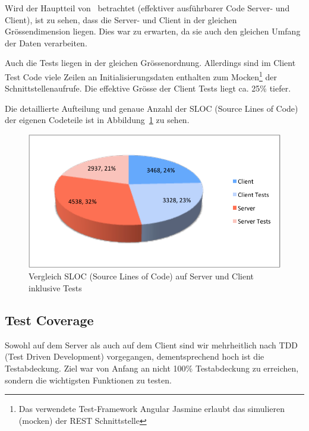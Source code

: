	Wird der Hauptteil von \eeppi\ betrachtet (effektiver ausführbarer Code Server- und Client),
	ist zu sehen, dass die Server- und Client in der gleichen Grössendimension liegen.
	Dies war zu erwarten, da sie auch den gleichen Umfang der Daten verarbeiten.
	
	Auch die Tests liegen in der gleichen Grössenordnung.
	Allerdings sind im Client Test Code viele Zeilen an Initialisierungsdaten enthalten zum Mocken\footnote{Das verwendete Test-Framework Angular Jasmine erlaubt das simulieren (mocken) der REST Schnittstelle} der Schnittstellenaufrufe. 
	Die effektive Grösse der Client Tests liegt ca. 25\% tiefer.
	
	Die detaillierte Aufteilung und genaue Anzahl der SLOC (Source Lines of Code) der eigenen Codeteile ist in Abbildung\ \ref{fig:serverClientSLOC} zu sehen.
	
	\begin{figure}[H]
		\includegraphics[width=\largeThird\textwidth]{projectPlan/media/img/serverClientSLOC.pdf}
		\centering
		\caption{Vergleich SLOC (Source Lines of Code) auf Server und Client inklusive Tests}
		\label{fig:serverClientSLOC}
	\end{figure}


	\subsection{Test Coverage}
	Sowohl auf dem Server als auch auf dem Client sind wir mehrheitlich nach TDD (Test Driven Development) vorgegangen,
	dementsprechend hoch ist die Testabdeckung.
	Ziel war von Anfang an nicht 100\% Testabdeckung zu erreichen, sondern die wichtigsten Funktionen zu testen.
	

